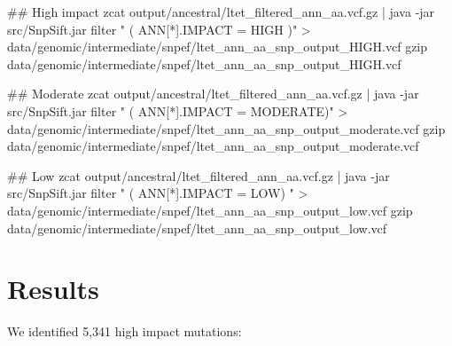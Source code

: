 \documentclass[
  letterpaper,
  DIV=11,
  numbers=noendperiod]{scrreprt}
\newenvironment{Shaded}{}{}
\newcommand{\NormalTok}[1]{\textcolor[rgb]{0.14,0.16,0.18}{#1}}
\begin{document}
\begin{Shaded}
\begin{Highlighting}[]

\NormalTok{\#\# High impact}
\NormalTok{zcat output/ancestral/ltet\_filtered\_ann\_aa.vcf.gz | java {-}jar src/SnpSift.jar filter " ( ANN[*].IMPACT = \textquotesingle{}HIGH\textquotesingle{} )" \textgreater{} data/genomic/intermediate/snpef/ltet\_ann\_aa\_snp\_output\_HIGH.vcf}
\NormalTok{gzip data/genomic/intermediate/snpef/ltet\_ann\_aa\_snp\_output\_HIGH.vcf}

\NormalTok{\#\# Moderate}
\NormalTok{zcat output/ancestral/ltet\_filtered\_ann\_aa.vcf.gz | java {-}jar src/SnpSift.jar filter " ( ANN[*].IMPACT = \textquotesingle{}MODERATE\textquotesingle{})" \textgreater{} data/genomic/intermediate/snpef/ltet\_ann\_aa\_snp\_output\_moderate.vcf}
\NormalTok{gzip data/genomic/intermediate/snpef/ltet\_ann\_aa\_snp\_output\_moderate.vcf}

\NormalTok{\#\# Low}
\NormalTok{zcat output/ancestral/ltet\_filtered\_ann\_aa.vcf.gz | java {-}jar src/SnpSift.jar filter " ( ANN[*].IMPACT = \textquotesingle{}LOW\textquotesingle{}) " \textgreater{} data/genomic/intermediate/snpef/ltet\_ann\_aa\_snp\_output\_low.vcf}
\NormalTok{gzip data/genomic/intermediate/snpef/ltet\_ann\_aa\_snp\_output\_low.vcf}
\end{Highlighting}
\end{Shaded}

\hypertarget{results}{%
\section{Results}\label{results}}

We identified 5,341 high impact mutations:
\end{document}
